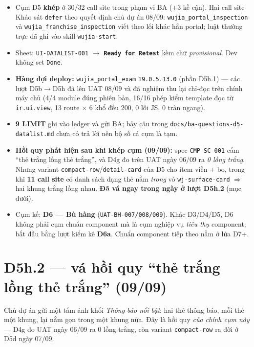 \begin{itemize}
\item Cụm D5 \textbf{khép} ở 30/32 call site trong phạm vi BA (+3 kề cận). Hai call site Khảo sát
  \texttt{defer} theo quyết định chủ dự án 08/09: \texttt{wujia\_portal\_inspection} và
  \texttt{wujia\_franchise\_inspection} viết theo lối khác hẳn portal; luật thường trực đã ghi vào
  skill \texttt{wujia-start}.
\item Sheet: \texttt{UI-DATALIST-001} $\to$ \textbf{\texttt{Ready for Retest}} kèm chữ
  \emph{provisional}. Dev không set \texttt{Done}.
\item \textbf{Hàng đợi deploy:} \texttt{wujia\_portal\_exam} \texttt{19.0.5.13.0} (phần D5h.1) ---
  các lượt D5b$\to$D5h đã lên UAT 08/09 và đã nghiệm thu lại chỉ-đọc trên chính máy chủ (4/4 module
  đúng phiên bản, 16/16 phép kiểm template đọc từ \texttt{ir.ui.view}, 13 route $\times$ 6 khổ đều
  200, 0 lỗi JS, 0 tràn ngang).
\item \textbf{9 LIMIT} ghi vào ledger và gửi BA; bảy câu trong
  \texttt{docs/ba-questions-d5-datalist.md} chưa có trả lời nên bộ số cả cụm là tạm.
\item \textbf{Hồi quy phát hiện sau khi khép cụm (09/09):} spec \texttt{CMP-SC-001} cấm
  ``thẻ trắng lồng thẻ trắng'', và D4g đo trên UAT ngày 06/09 ra \emph{0 lồng trắng}. Nhưng
  variant \texttt{compact-row}/\texttt{detail-card} của D5 cho item viền + bo, trong khi
  \textbf{11 call site} có danh sách dạng thẻ nằm \emph{trong} vỏ \texttt{wj-surface-card}
  $\Rightarrow$ hai khung trắng lồng nhau. \textbf{Đã vá ngay trong ngày ở lượt D5h.2}
  (mục dưới).
\item Cụm kế: \textbf{D6 --- Bù hàng} (\texttt{UAT-BH-007/008/009}). Khác D3/D4/D5, D6 không phải
  cụm chuẩn component mà là cụm nghiệp vụ \emph{tiêu thụ} component; bắt đầu bằng lượt kiểm kê
  \textbf{D6a}. Chuẩn component tiếp theo nằm ở lứa D7+.
\end{itemize}

\section{D5h.2 --- vá hồi quy ``thẻ trắng lồng thẻ trắng'' (09/09)}

Chủ dự án gửi một tấm ảnh khối \emph{Thông báo nổi bật}: hai thẻ thông báo, mỗi thẻ một khung, lại
nằm gọn trong một khung nữa. Đây là hồi quy \emph{của chính cụm này} --- D4g đo UAT ngày 06/09 ra
0 lồng trắng, còn variant \texttt{compact-row} ra đời ở D5d ngày 07/09.

